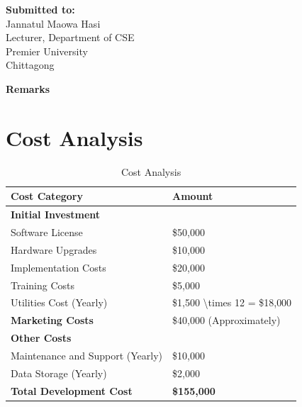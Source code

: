 \documentclass{scrreprt}
\begin{document}
\begin{titlepage}
    \begin{minipage}[t]{0.48\textwidth}
        \textbf{Submitted to:}\\
        Jannatul Maowa Hasi\\
        Lecturer, Department of CSE\\
        Premier University\\
        Chittagong
    \end{minipage}%
    \hfill
    \begin{minipage}[t]{0.48\textwidth}
        \raggedleft
        \textbf{Remarks}\\
        \vspace{0.5cm} %
    \end{minipage}

    \date{\today}
    \vfill
\end{titlepage}
\section*{Cost Analysis}

\begin{table}[h!]
\centering
\begin{tabular}{|p{8cm}|p{4cm}|}
\hline
\textbf{Cost Category} & \textbf{Amount} \\
\hline
\textbf{Initial Investment} & \\
\hline
\hspace{10pt} Software License & \$50{,}000 \\
\hline
\hspace{10pt} Hardware Upgrades & \$10{,}000 \\
\hline
\hspace{10pt} Implementation Costs & \$20{,}000 \\
\hline
\hspace{10pt} Training Costs & \$5{,}000 \\
\hline
\hspace{10pt} Utilities Cost (Yearly) & \$1{,}500 \textbackslash times 12 = \$18{,}000 \\
\hline
\textbf{Marketing Costs} & \$40{,}000 (Approximately) \\
\hline
\textbf{Other Costs} & \\
\hline
\hspace{10pt} Maintenance and Support (Yearly) & \$10{,}000 \\
\hline
\hspace{10pt} Data Storage (Yearly) & \$2{,}000 \\
\hline
\textbf{Total Development Cost} & \textbf{\$155{,}000} \\
\hline
\end{tabular}
\caption{Cost Analysis}
\end{table}
\end{document}

